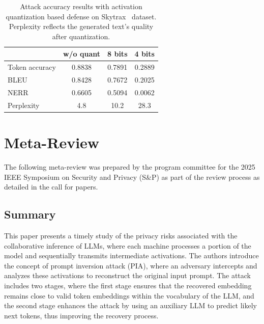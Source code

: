 \begin{table}[ht]
\centering
\scalebox{1}
{
\begin{tabular}{|l|c|c|c|}
\hline
         & w/o quant & 8 bits & 4 bits \\ \hline
Token accuracy &    0.8838             &   0.7891     &   0.2889     \\ \hline
BLEU     &       0.8428          &   0.7672     &   0.2025     \\ \hline
NERR     &      0.6605      &   0.5094    &       0.0062  \\ \hline
Perplexity     &   4.8          &  10.2      &   28.3     \\ \hline
\end{tabular}
}
\caption{Attack accuracy results with activation quantization based defense on Skytrax~\cite{skytrax} dataset. Perplexity reflects the generated text's quality after quantization.}
\label{tab:quantization}
\end{table}




\section{Meta-Review}

The following meta-review was prepared by the program committee for the 2025
IEEE Symposium on Security and Privacy (S\&P) as part of the review process as
detailed in the call for papers.

\subsection{Summary}
This paper presents a timely study of the privacy risks associated with the collaborative inference of LLMs, where each machine processes a portion of the model and sequentially transmits intermediate activations. The authors introduce the concept of prompt inversion attack (PIA), where an adversary intercepts and analyzes these activations to reconstruct the original input prompt. The attack includes two stages, where the first stage ensures that the recovered embedding remains close to valid token embeddings within the vocabulary of the LLM, and the second stage enhances the attack by using an auxiliary LLM to predict likely next tokens, thus improving the recovery process.

